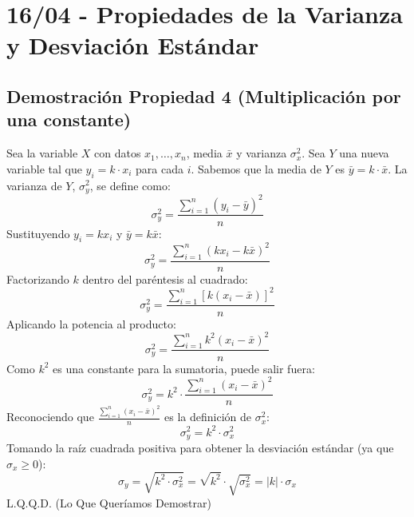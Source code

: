 \documentclass[12pt, letterpaper]{article}
\begin{document}
\section{16/04 - Propiedades de la Varianza y Desviación Estándar}
\subsection{Demostración Propiedad 4 (Multiplicación por una constante)}
Sea la variable $X$ con datos $x_1, \dots, x_n$, media $\bar{x}$ y varianza $\sigma_x^2$.
Sea $Y$ una nueva variable tal que $y_i = k \cdot x_i$ para cada $i$.
Sabemos que la media de $Y$ es $\bar{y} = k \cdot \bar{x}$.
La varianza de $Y$, $\sigma_y^2$, se define como:
\[\sigma_y^2=\frac{\sum_{i=1}^{n} (y_i - \bar{y})^2}{n} \]
Sustituyendo $y_i = kx_i$ y $\bar{y} = k\bar{x}$:
\[\sigma_y^2=\frac{\sum_{i=1}^{n} (kx_i - k\bar{x})^2}{n}\]
Factorizando $k$ dentro del paréntesis al cuadrado:
\[\sigma_y^2=\frac{\sum_{i=1}^{n} [k(x_i - \bar{x})]^2}{n}\]
Aplicando la potencia al producto:
\[\sigma_y^2=\frac{\sum_{i=1}^{n} k^2(x_i - \bar{x})^2}{n}\]
Como $k^2$ es una constante para la sumatoria, puede salir fuera:
\[\sigma_y^2=k^2 \cdot \frac{\sum_{i=1}^{n} (x_i - \bar{x})^2}{n}\]
Reconociendo que $\frac{\sum_{i=1}^{n} (x_i - \bar{x})^2}{n}$ es la definición de $\sigma_x^2$:
\[\sigma_y^2=k^2 \cdot \sigma_x^2\]
Tomando la raíz cuadrada positiva para obtener la desviación estándar (ya que $\sigma_x \ge 0$):
\[\sigma_y = \sqrt{k^2 \cdot \sigma_x^2} = \sqrt{k^2} \cdot \sqrt{\sigma_x^2} = |k| \cdot \sigma_x\]
L.Q.Q.D. (Lo Que Queríamos Demostrar)
\end{document}

